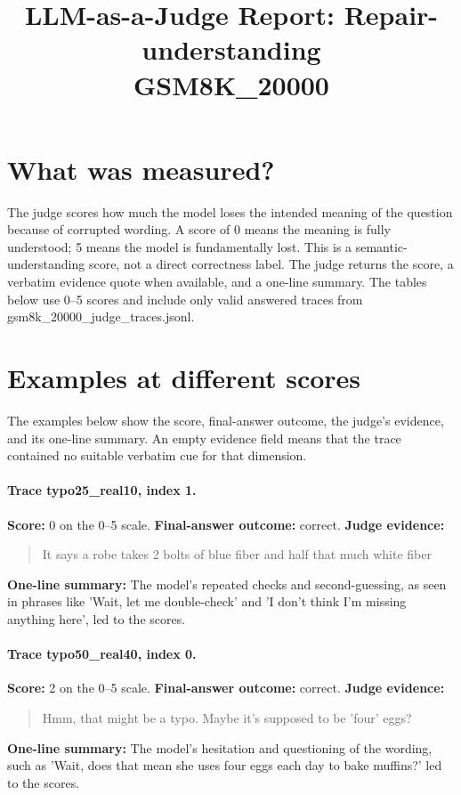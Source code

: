 \documentclass[11pt]{article}
\title{LLM-as-a-Judge Report: Repair-understanding\\\large GSM8K\_20000}
\date{}
\begin{document}
\maketitle

\section*{What was measured?} The judge scores how much the model loses the intended meaning of the question because of corrupted wording. A score of 0 means the meaning is fully understood; 5 means the model is fundamentally lost. This is a semantic-understanding score, not a direct correctness label. The judge returns the score, a verbatim evidence quote when available, and a one-line summary. The tables below use 0--5 scores and include only valid answered traces from gsm8k\_20000\_judge\_traces.jsonl.

\section*{Examples at different scores} The examples below show the score, final-answer outcome, the judge's evidence, and its one-line summary. An empty evidence field means that the trace contained no suitable verbatim cue for that dimension.

\paragraph{Trace typo25\_real10, index 1.}
\textbf{Score:} 0 on the 0--5 scale. \textbf{Final-answer outcome:} correct.
\textbf{Judge evidence:} \begin{quote}It says a robe takes 2 bolts of blue fiber and half that much white fiber\end{quote}
\textbf{One-line summary:} The model's repeated checks and second-guessing, as seen in phrases like 'Wait, let me double-check' and 'I don't think I'm missing anything here', led to the scores.\medskip
\paragraph{Trace typo50\_real40, index 0.}
\textbf{Score:} 2 on the 0--5 scale. \textbf{Final-answer outcome:} correct.
\textbf{Judge evidence:} \begin{quote}Hmm, that might be a typo. Maybe it's supposed to be 'four' eggs?\end{quote}
\textbf{One-line summary:} The model's hesitation and questioning of the wording, such as 'Wait, does that mean she uses four eggs each day to bake muffins?' led to the scores.\medskip
\end{document}
